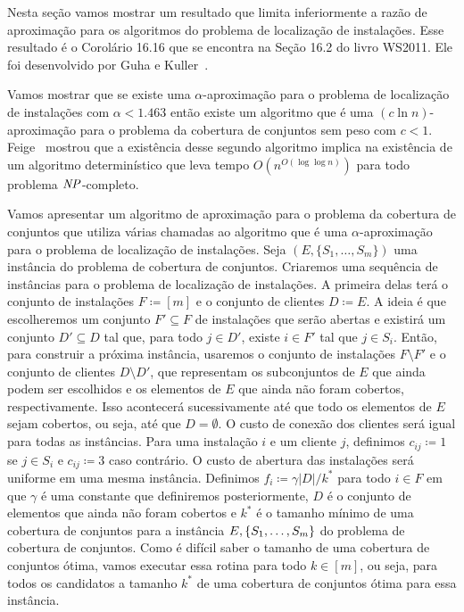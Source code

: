 Nesta seção vamos mostrar um resultado que limita inferiormente a razão de aproximação para os algoritmos do problema de localização de instalações. Esse resultado é o Corolário 16.16 que se encontra na Seção 16.2 do livro WS2011. Ele foi desenvolvido por Guha e Kuller~\cite{GUHA1999228}.

Vamos mostrar que se existe uma $\alpha$-aproximação para o problema de localização de instalações com $\alpha < 1.463$ então existe um algoritmo que é uma $(c \ln n)$-aproximação para o problema da cobertura de conjuntos sem peso com $c<1$. 
Feige~\cite{Feige98} mostrou que a existência desse segundo algoritmo implica na existência de um algoritmo determinístico que leva tempo $O(n^{O(\log\log n)})$ para todo problema $\mathit{NP}$-completo.

Vamos apresentar um algoritmo de aproximação para o problema da cobertura de conjuntos que utiliza várias chamadas ao algoritmo que é uma $\alpha$-aproximação para o problema de localização de instalações. 
Seja $(E,\{S_1,\ldots,S_m\})$ uma instância do problema de cobertura de conjuntos. Criaremos uma sequência de instâncias para o problema de localização de instalações. 
A primeira delas terá o conjunto de instalações $F \coloneqq [m]$ e o conjunto de clientes $D \coloneqq E$. 
A ideia é que escolheremos um conjunto $F' \subseteq F$ de instalações que serão abertas e existirá um conjunto $D' \subseteq D$ tal que, para todo $j \in D'$, existe $i \in F'$ tal que $j \in S_i$. 
Então, para construir a próxima instância, usaremos o conjunto de instalações $F \setminus F'$ e o conjunto de clientes $D \setminus D'$, que representam os subconjuntos de $E$ que ainda podem ser escolhidos e os elementos de $E$ que ainda não foram cobertos, respectivamente. 
Isso acontecerá sucessivamente até que todo os elementos de $E$ sejam cobertos, ou seja, até que $D = \emptyset$.
O custo de conexão dos clientes será igual para todas as instâncias. Para uma instalação $i$ e um cliente $j$, definimos $c_{ij}\coloneqq 1$ se $j \in S_i$ e $c_{ij} \coloneqq 3$ caso contrário.
O custo de abertura das instalações será uniforme em uma mesma instância. Definimos $f_i \coloneqq \gamma |D|/k^*$ para todo $i\in F$ em que $\gamma$ é uma constante que definiremos posteriormente, $D$ é o conjunto de elementos que ainda não foram cobertos e $k^*$ é o tamanho mínimo de uma cobertura de conjuntos para a instância $E,\{S_1,\ldots,S_m\}$ do problema de cobertura de conjuntos. Como é difícil saber o tamanho de uma cobertura de conjuntos ótima, vamos executar essa rotina para todo $k \in [m]$, ou seja, para todos os candidatos a tamanho $k^*$ de uma cobertura de conjuntos ótima para essa instância.


